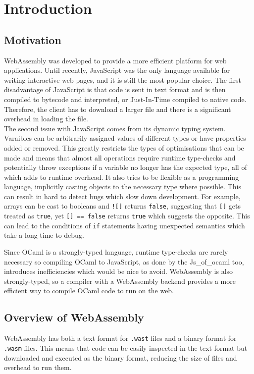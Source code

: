 \chapter{Introduction}

\section{Motivation}
WebAssembly was developed to provide a more efficient platform for web applications. Until recently, JavaScript was the only language available for writing interactive web pages, and it is still the most popular choice. The first disadvantage of JavaScript is that code is sent in text format and is then compiled to bytecode  and interpreted, or Just-In-Time compiled to native code. Therefore, the client has to download a larger file and there is a significant overhead in loading the file. \\
%
The second issue with JavaScript comes from its dynamic typing system. Varaibles can be arbitrarily assigned values of different types or have properties added or removed. This greatly restricts the types of optimisations that can be made and means that almost all operations require runtime type-checks and potentially throw exceptions if a variable no longer has the expected type, all of which adds to runtime overhead. It also tries to be flexible as a programming language, implicitly casting objects to the necessary type where possible. This can result in hard to detect bugs which slow down development. For example, arrays can be cast to booleans and \verb|![]| returns \verb|false|, suggesting that \verb|[]| gets treated as \verb|true|, yet \verb|[] == false| returns \verb|true| which suggests the opposite. This can lead to the conditions of \verb|if| statements having unexpected semantics which take a long time to debug. 

Since OCaml is a strongly-typed language, runtime type-checks are rarely necessary so compiling OCaml to JavaScript, as done by the Js\_of\_ocaml too, introduces inefficiencies which would be nice to avoid. WebAssembly is also strongly-typed, so a compiler with a WebAssembly backend provides a more efficient way to compile OCaml code to run on the web. 

\section{Overview of WebAssembly}
WebAssembly has both a text format for \verb|.wast| files and a binary format for \verb|.wasm| files. This means that code can be easily inspected in the text format but downloaded and executed as the binary format, reducing the size of files and overhead to run them.
